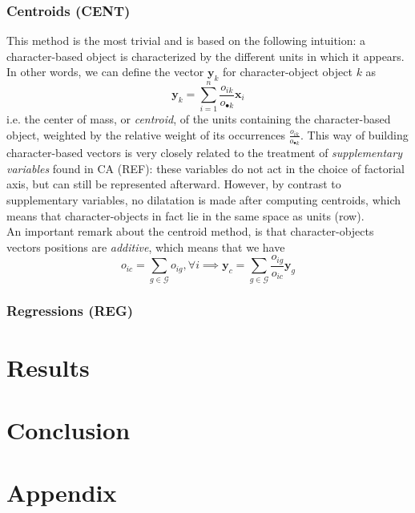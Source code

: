 \documentclass[
twocolumn,
]{ceurart}
\begin{document}
\subsubsection{Centroids (CENT)}
\label{centroid}

This method is the most trivial and is based on the following intuition: a character-based object is characterized by the different units in which it appears. In other words, we can define the vector $\mathbf{y}_k$ for character-object object $k$ as
\begin{equation}
\mathbf{y}_k = \sum_{i=1}^n \frac{o_{ik}}{o_{\bullet k}} \mathbf{x}_i
\end{equation}
i.e. the center of mass, or \emph{centroid}, of the units containing the character-based object, weighted by the relative weight of its occurrences $\frac{o_{ik}}{o_{\bullet k}}$. This way of building character-based vectors is very closely related to the treatment of \emph{supplementary variables} found in CA (REF): these variables do not act in the choice of factorial axis, but can still be represented afterward. However, by contrast to supplementary variables, no dilatation is made after computing centroids, which means that character-objects in fact lie in the same space as units (row). \\
An important remark about the centroid method, is that character-objects vectors positions are \emph{additive}, which means that we have
\begin{equation}
o_{ic} = \sum_{g \in \mathcal{G}} o_{ig}, \forall i \implies \mathbf{y}_c = \sum_{g \in \mathcal{G}} \frac{o_{ig}}{o_{ic}} \mathbf{y}_g
\end{equation}

\subsubsection{Regressions (REG)}
\label{regression}

\section{Results}

\section{Conclusion}

\appendix

\section{Appendix}
\end{document}
